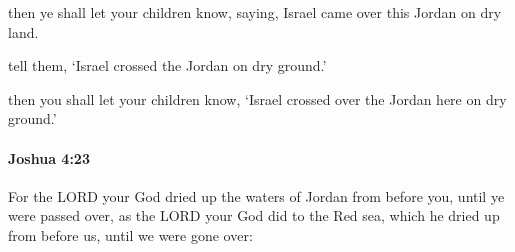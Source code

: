 			\begin{versebox}
					\item[BHS] 
					\item[ASV] then ye shall let your children know, saying, Israel came over this Jordan on dry land.
					\item[NIV] tell them, ‘Israel crossed the Jordan on dry ground.’
					\item[NRSV] then you shall let your children know, ‘Israel crossed over the Jordan here on dry ground.’
			\end{versebox}

		\paragraph{Joshua 4:23} %
			\label{JOSHUA-4-23}

			For the LORD your God dried up the waters of Jordan from before you, until ye were passed over, as the LORD your God did to the Red sea, which he dried up from before us, until we were gone over:

